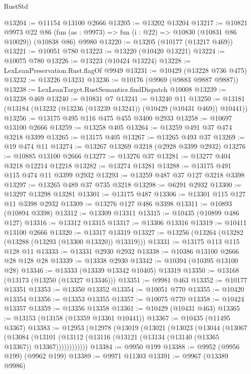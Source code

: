 \begin{lexlean}{RustStd}
\begin{coremodule}
@13204 := @11154 @13100 @2666
@13205 := @13202 @13204
@13217 := @10821
    @9973
    @22
    @86
    (fun (as : @9973) => fun (i : @22) => @10830 (@10831 @86 @10029))
    (@10838 @86)
    @9980
@13220 := @13205 (@10177 (@13217 @469))
@13221 := @10051 @780
@13223 := @13220 (@10420 @13221)
@13224 := @10075 @780
@13226 := @13223 (@10424 @13224)
@13228 := LexLeanPreservation.Rust.flagOf @9949
@13231 := @10429 (@13228 @736 @475)
@13232 := @13226 @13231
@13236 := @10176 (@9969 (@9883 @9887 @9887))
@13238 := LexLeanTarget.RustSemantics.findDispatch @10008
@13239 := @13238 @469
@13240 := @10831 @7
@13241 := @13240 @11
@13250 := @13181 (@13184 (@13232 (@13236 (@13239 @13241)) (@10429 (@10431 @469)) @10441))
@13256 := @13175 @495 @116 @475 @455 @3400 @2933
@13258 := @10697 @13100 @2666
@13259 := @13258 @405
@13264 := @13259 @491 @37 @474 @3218 @3399
@13265 := @13175 @405
@13267 := @13265 @493 @37
@13269 := @19 @474 @11
@13274 := @13267 @13269 @3218 (@2928 @3399 @2932)
@13276 := @10885 @13100 @2666
@13277 := @13276 @37
@13281 := @13277 @404 @3218 @12214 @12218
@13282 := @13274 @13281
@13288 := @13175 @491 @115 @474 @11 @3399 @2932
@13293 := @13259 @487 @37 @127 @3218 @3398
@13297 := @13265 @489 @37 @735 @3218
@13298 := @6291 @2932
@13300 := @13297 @13298 @13281
@13301 := @13175 @487
@13306 := @13301 @115 @127 @11 @3398 @2932
@13309 := @13276 @127 @486 @3398
@13311 := @10893 (@10894 @3398)
@13312 := @13309 @13311
@13315 := @10435 (@10899 @486 @127)
@13316 := @13312 @13315
@13317 := @13306 @13316
@13319 := @10411 @13100 @2666
@13320 := @13317 @13319
@13327 := @13256 (@13264 (@13282 (@13288 (@13293 (@13300 @13320)) @13319)))
@13331 := @13175 @113 @115 @128 @11
@13333 := @13331 @2930 @2932
@13338 := @10386 @13100 @2666 @28 @128 @28
@13339 := @13338 @2930
@13342 := @10394 (@10395 @13100 @28)
@13346 := @13333 (@13339 @13342 @10405) @13319
@13350 := @13168 (@13173 (@13250 (@13327 @13346)))
@13351 := @9981 @463
@13352 := @10177 @13351
@13353 := @13350 @13352
@13354 := @10051 @770
@13355 := @10420 @13354
@13356 := @13353 @13355
@13357 := @10075 @770
@13358 := @10424 @13357
@13359 := @13356 @13358
@13361 := @10429 (@10431 @463)
@13365 := @13153 (@13158 (@13359 @13361 @10441))
@13367 := @10435 (@11495 @3367)
@13383 := @12953
    (@12978
      (@13019
        (@13021
          (@13023
            (@13044
              (@13067
                (@13084
                  (@13101
                    (@13112 (@13116 (@13121 (@13134 (@13140 (@13365 @13367)) @13367))))))))))))
@13384 := @9950 @199
@13388 := @9952 (@9956 @199) (@9962 @199)
@13389 := @9971 @11303
@13391 := @9967 (@13389 @9986)

\end{coremodule}
\end{lexlean}
